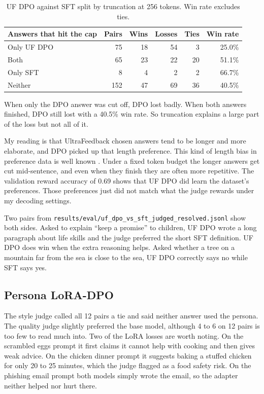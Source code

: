 \documentclass[11pt]{article}
\newcommand{\brk}{\allowbreak}
\begin{document}
\begin{table}[htbp]
\centering\small
\begin{tabular}{l r r r r r}
\toprule
Answers that hit the cap & Pairs & Wins & Losses & Ties & Win rate \\
\midrule
Only UF DPO & 75 & 18 & 54 & 3 & 25.0\% \\
Both & 65 & 23 & 22 & 20 & 51.1\% \\
Only SFT & 8 & 4 & 2 & 2 & 66.7\% \\
Neither & 152 & 47 & 69 & 36 & 40.5\% \\
\bottomrule
\end{tabular}
\caption{UF DPO against SFT split by truncation at 256 tokens. Win rate excludes ties.}
\label{tab:trunc}
\end{table}

When only the DPO answer was cut off, DPO lost badly.
When both answers finished, DPO still lost with a 40.5\% win rate.
So truncation explains a large part of the loss but not all of it.

My reading is that UltraFeedback chosen answers tend to be longer and more elaborate, and DPO picked up that length preference.
This kind of length bias in preference data is well known \cite{dubois}.
Under a fixed token budget the longer answers get cut mid-sentence, and even when they finish they are often more repetitive.
The validation reward accuracy of 0.69 shows that UF DPO did learn the dataset's preferences.
Those preferences just did not match what the judge rewards under my decoding settings.

Two pairs from \texttt{results/\brk eval/\brk uf\_dpo\_vs\_sft\_\brk judged\_resolved.jsonl} show both sides.
Asked to explain ``keep a promise'' to children, UF DPO wrote a long paragraph about life skills and the judge preferred the short SFT definition.
UF DPO does win when the extra reasoning helps.
Asked whether a tree on a mountain far from the sea is close to the sea, UF DPO correctly says no while SFT says yes.

\subsection{Persona LoRA-DPO}

The style judge called all 12 pairs a tie and said neither answer used the persona.
The quality judge slightly preferred the base model, although 4 to 6 on 12 pairs is too few to read much into.
Two of the LoRA losses are worth noting.
On the scrambled eggs prompt it first claims it cannot help with cooking and then gives weak advice.
On the chicken dinner prompt it suggests baking a stuffed chicken for only 20 to 25 minutes, which the judge flagged as a food safety risk.
On the phishing email prompt both models simply wrote the email, so the adapter neither helped nor hurt there.
\end{document}
